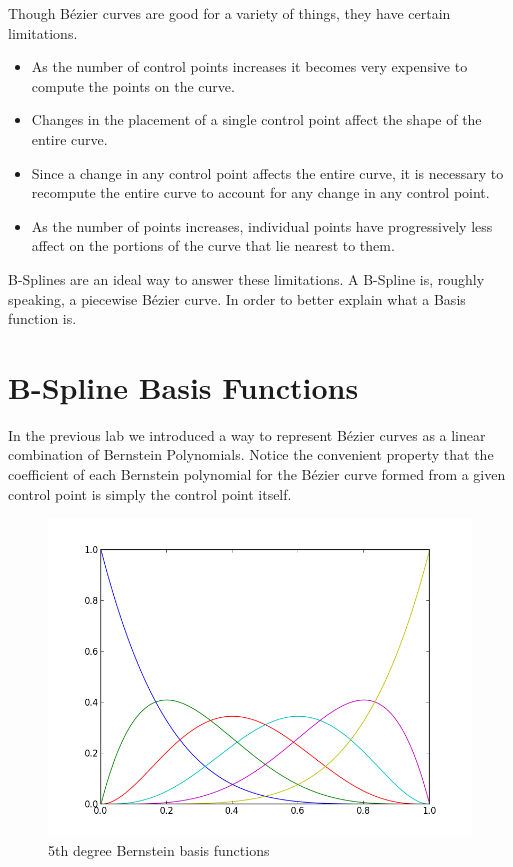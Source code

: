 Though B\'{e}zier curves are good for a variety of things, they have certain limitations.
\begin{itemize}
\item As the number of control points increases it becomes very expensive to compute the points on the curve.
\item Changes in the placement of a single control point affect the shape of the entire curve.
\item Since a change in any control point affects the entire curve, it is necessary to recompute the entire curve to account for any change in any control point.
\item As the number of points increases, individual points have progressively less affect on the portions of the curve that lie nearest to them.
\end{itemize}

B-Splines are an ideal way to answer these limitations.
A B-Spline is, roughly speaking, a piecewise B\'{e}zier curve.
In order to better explain what a Basis function is.

\section*{B-Spline Basis Functions}

In the previous lab we introduced a way to represent B\'{e}zier curves as a linear combination of Bernstein Polynomials.
Notice the convenient property that the coefficient of each Bernstein polynomial for the B\'{e}zier curve formed from a given control point is simply the control point itself.

\begin{figure}
\includegraphics[width=\textwidth]{bernstein_basis}
\caption{5th degree Bernstein basis functions}
\end{figure}

